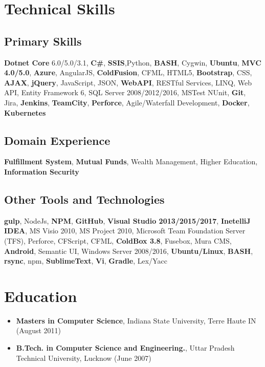 \documentclass[letterpaper,11pt]{article}
\begin{document}
\section{Technical Skills}
\subsection{Primary Skills}
\textbf{Dotnet Core} 6.0/5.0/3.1, \textbf{C\#}, \textbf{SSIS},Python, \textbf{BASH}, Cygwin, \textbf{Ubuntu}, \textbf{MVC 4.0/5.0}, \textbf{Azure}, AngularJS, \textbf{ColdFusion}, CFML, HTML5, \textbf{Bootstrap}, CSS, \textbf{AJAX}, \textbf{jQuery}, JavaScript, JSON, \textbf{WebAPI}, RESTful Services, LINQ, Web API, Entity Framework 6, SQL Server 2008/2012/2016, MSTest NUnit, \textbf{Git}, Jira, \textbf{Jenkins}, \textbf{TeamCity}, \textbf{Perforce}, Agile/Waterfall Development, \textbf{Docker}, \textbf{Kubernetes}

\subsection{Domain Experience}
\textbf{Fulfillment System}, \textbf{Mutual Funds}, Wealth Management, Higher Education, \textbf{Information Security}

\subsection{Other Tools and Technologies}
\textbf{gulp}, NodeJs, \textbf{NPM}, \textbf{GitHub}, \textbf{Visual Studio 2013/2015/2017}, \textbf{InetelliJ IDEA}, MS Visio 2010, MS Project 2010, Microsoft Team Foundation Server (TFS), Perforce, CFScript, CFML, \textbf{ColdBox 3.8}, Fusebox, Mura CMS, \textbf{Android}, Semantic UI, Windows Server 2008/2016, \textbf{Ubuntu/Linux}, \textbf{BASH}, \textbf{rsync}, npm, \textbf{SublimeText}, \textbf{Vi}, \textbf{Gradle}, Lex/Yacc

\section{Education}
\begin{itemize}
    \item \textbf{Masters in Computer Science}, Indiana State University, Terre Haute IN (August 2011)
    \item \textbf{B.Tech. in Computer Science and Engineering.}, Uttar Pradesh Technical University, Lucknow (June 2007)
\end{itemize}
\end{document}
